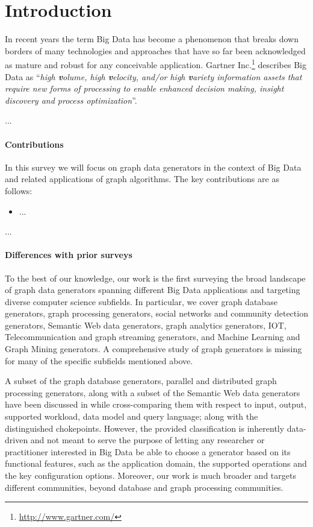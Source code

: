 \section{Introduction}
\label{sec:intro}

In recent years the term Big Data has become a phenomenon that breaks down borders of many technologies and approaches that have so far been acknowledged as mature and robust for any conceivable application. Gartner Inc.\footnote{\url{http://www.gartner.com/}} describes Big Data as ``\emph{high \textbf{v}olume, high \textbf{v}elocity, and/or high \textbf{v}ariety information assets that require new forms of processing to enable enhanced decision making, insight discovery and process optimization}''.

...


\paragraph*{Contributions} In this survey we will focus on graph data generators in the context of Big Data and related applications of graph algorithms. The key contributions are as follows:
\begin{itemize}
  \item ...
\end{itemize}

...

\paragraph*{Differences with prior surveys}

To the best of our knowledge, our work is the first surveying the broad landscape of graph data generators spanning different Big Data applications and 
targeting diverse computer science subfields. In particular, we cover graph database
generators, graph processing generators, social networks and community detection
generators, Semantic Web data generators, graph
analytics generators, IOT, Telecommunication and graph streaming generators, 
and Machine Learning and Graph Mining generators. A comprehensive study of
graph generators is missing for many of the specific subfields mentioned
above.   

A subset of the graph database
generators, parallel and distributed graph processing generators, along
with a subset of the Semantic Web data generators have been discussed in
\cite{BFHI18} while cross-comparing them with respect to input, output,
supported workload, data model and query language; along with the
distinguished chokepoints. However, the provided classification is
inherently data-driven and not meant to serve the purpose of letting any
researcher or practitioner interested in Big Data be able to choose a
generator based on its functional features, such as the application domain,
the supported operations and the key configuration options. 
Moreover, our work is much broader and targets different communities, beyond database
and graph processing communities. 

